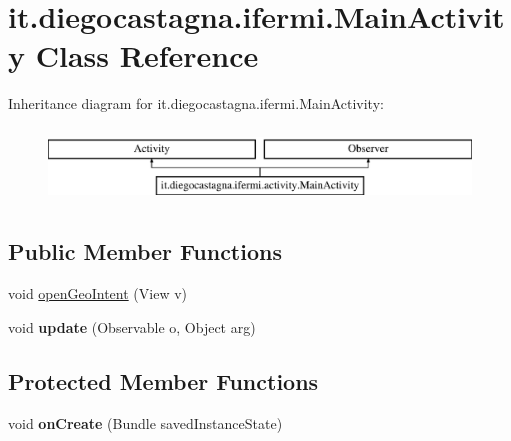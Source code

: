 \hypertarget{classit_1_1diegocastagna_1_1ifermi_1_1_main_activity}{}\section{it.\+diegocastagna.\+ifermi.\+Main\+Activity Class Reference}
\label{classit_1_1diegocastagna_1_1ifermi_1_1_main_activity}
Inheritance diagram for it.\+diegocastagna.\+ifermi.\+Main\+Activity\+:\begin{figure}[H]
\begin{center}
\leavevmode
\includegraphics[height=2.000000cm]{classit_1_1diegocastagna_1_1ifermi_1_1_main_activity}
\end{center}
\end{figure}
\subsection*{Public Member Functions}
\begin{DoxyCompactItemize}
\item 
void \mbox{\hyperlink{classit_1_1diegocastagna_1_1ifermi_1_1_main_activity_ae2ae327990e45705546cae9f17ead95b}{open\+Geo\+Intent}} (View v)
\item 
\mbox{\label{classit_1_1diegocastagna_1_1ifermi_1_1_main_activity_a068504677568a06be85220f82214c22d}} 
void {\bfseries update} (Observable o, Object arg)
\end{DoxyCompactItemize}
\subsection*{Protected Member Functions}
\begin{DoxyCompactItemize}
\item 
\mbox{\label{classit_1_1diegocastagna_1_1ifermi_1_1_main_activity_a55c1672941cbac37e2d5877529c74921}} 
void {\bfseries on\+Create} (Bundle saved\+Instance\+State)
\end{DoxyCompactItemize}


